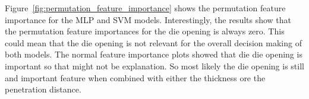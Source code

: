 Figure~\ref{fig:permutation_feature_importance} shows the permutation feature importance for the
\ac{MLP} and \ac{SVM} models.
Interestingly, the results show that the permutation feature importances for the die opening is
always zero.
This could mean that the die opening is not relevant for the overall decision making of both
models.
The normal feature importance plots showed that die die opening is important so that might not be
explanation.
So most likely the die opening is still and important feature when combined with either the
thickness ore the penetration distance.




\begin{table}[ht]
    \begin{tcolorbox}[arc=0pt,boxrule=0.5pt]
        \centering
        \qquad
\end{tcolorbox}
\end{table}
